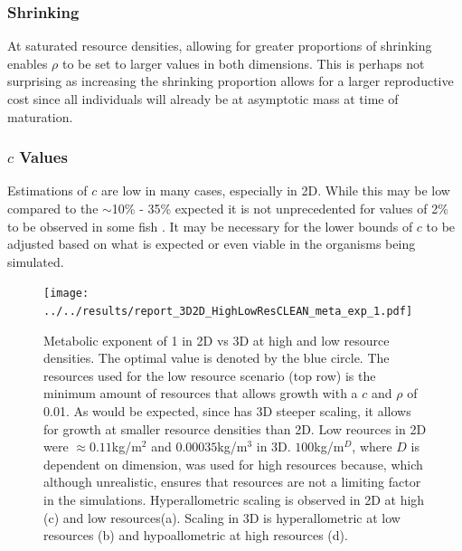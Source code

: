 \documentclass[a4paper, 11pt, hidelinks]{article} %
\begin{document}
	\subsubsection{Shrinking}
	At saturated resource densities, allowing for greater proportions of shrinking enables $\rho$ to be set to larger values in both dimensions.  This is perhaps not surprising as increasing the shrinking proportion allows for a larger reproductive cost since all individuals will already be at asymptotic mass at time of maturation.
	
	\subsubsection{$c$ Values}
	Estimations of $c$ are low in many cases, especially in 2D.  While this may be low compared to the $\sim$10\% - 35\% expected \parencite{Benoit2018, Fontoura2009, Roff1983} it is not unprecedented for values of 2\% to be observed in some fish \parencite{Gunderson1997}.  It may be necessary for the lower bounds of $c$ to be adjusted based on what is expected or even viable in the organisms being simulated.
	

	\begin{figure}[h!]
				
		\centering
		\texttt{[image: ../../results/report\_3D2D\_HighLowResCLEAN\_meta\_exp\_1.pdf]}
		
		\caption{Metabolic exponent of 1 in 2D vs 3D at high and low resource densities. The optimal value is denoted by the blue circle.
			The resources used for the low resource scenario (top row) is the minimum amount of resources that allows growth with a $c$ and $\rho$ of 0.01.  As would be expected, since has 3D steeper scaling, it allows for growth at smaller resource densities than 2D.
			Low reources in 2D were $ \approx 0.11$kg/m$^2 $ and $ 0.00035$kg/m$^3 $ in 3D.
			$ 100$kg/m$^D $, where $D$ is dependent on dimension, was used for high resources because, which although unrealistic, ensures that resources are not a limiting factor in the simulations.
			Hyperallometric scaling is observed in 2D at high (c) and low resources(a).
			Scaling in 3D is hyperallometric at low resources (b) and hypoallometric at high resources (d).}
		\label{resources2D3D_meta_exp1}
	\end{figure}
\end{document}
